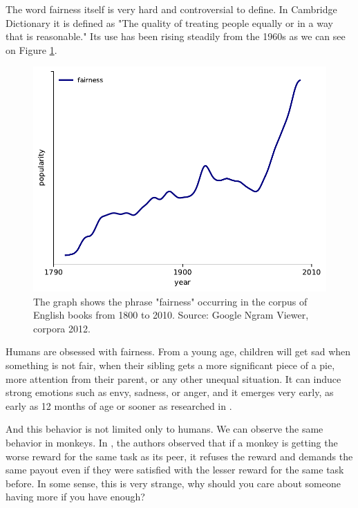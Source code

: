 The word fairness
itself is very hard and controversial to define.
In Cambridge Dictionary \cite{fairness_definition} it is
defined as "The quality of treating people equally or in a way that is reasonable." Its use has been rising steadily from the 1960s as we can see on Figure \ref{fig:popularity_of_fairness}.

\begin{figure}[htbp]
    \centering
    \includegraphics{img/google_ngram_fairness-eng_2012-1800-2000.pdf}
    \caption{The graph shows the phrase "fairness" occurring in the corpus of English books from 1800 to 2010. Source: Google Ngram Viewer, corpora 2012. \cite{google_ngram_viewer_2012}}
    \label{fig:popularity_of_fairness}
\end{figure}

Humans are obsessed with fairness. From a young age, children will get sad when something is not fair, when their sibling gets a more significant piece of a pie, more attention from their parent, or any other unequal situation. It can induce strong emotions such as envy, sadness, or anger, and it emerges very early, as early as 12 months of age or sooner as researched in \cite{children_fairness}.

And this behavior is not limited only to humans. We can observe the same behavior in monkeys. In \cite{brosnan2003monkeys}, the authors observed that if a monkey is getting the worse reward for the same task as its peer,  it refuses the reward and demands the same payout even if they were satisfied with the lesser reward for the same task before. In some sense, this is very strange, why should you care about someone having more if you have enough?


